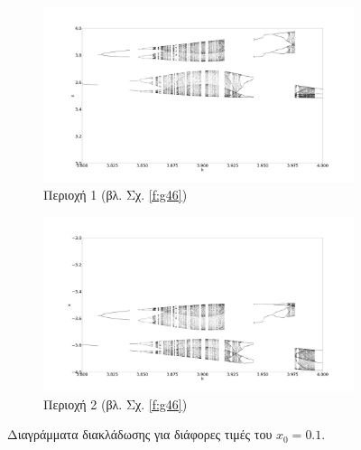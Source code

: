 \begin{figure}[ht]
	\centering
	
	\begin{subfigure}[b]{0.8\textwidth}
		\centering
		\includegraphics[width=\textwidth]{LateX images/sine q=-0.5/g3}
		\caption{Περιοχή 1 (βλ. Σχ. \ref{f:g46})}
		\label{f:g52}
	\end{subfigure}
	\hfill
	\begin{subfigure}[b]{0.8\textwidth}
		\centering
		\includegraphics[width=\textwidth]{LateX images/sine q=-0.5/g3.2}
		\caption{Περιοχή 2 (βλ. Σχ. \ref{f:g46})}
		\label{f:g533}
	\end{subfigure}
	
	\caption{Διαγράμματα διακλάδωσης για διάφορες τιμές του $x_0=0.1$. }
	\label{f:g237}
\end{figure}
